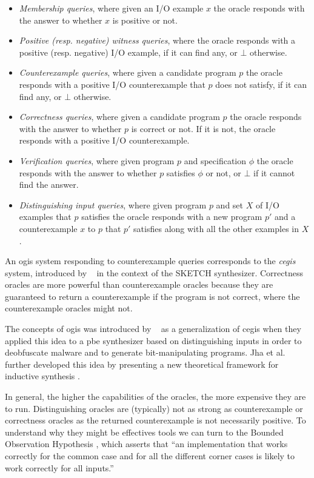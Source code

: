 \begin{itemize}
\item \textit{Membership queries}, where given an I/O example $x$ the oracle
  responds with the answer to whether $x$ is positive or not.
\item \textit{Positive (resp. negative) witness queries}, where the oracle
  responds with a positive (resp. negative) I/O example, if it can find any, or
  $\bot$ otherwise.
\item \textit{Counterexample queries}, where given a candidate program $p$ the
  oracle responds with a positive I/O counterexample that $p$ does not satisfy,
  if it can find any, or $\bot$ otherwise.
\item \textit{Correctness queries}, where given a candidate program $p$ the
  oracle responds with the answer to whether $p$ is correct or not. If it is not,
  the oracle responds with a positive I/O counterexample.
\item \textit{Verification queries}, where given program $p$ and specification
  $\phi$ the oracle responds with the answer to whether $p$ satisfies $\phi$ or
  not, or $\bot$ if it cannot find the answer.
\item \textit{Distinguishing input queries}, where given program $p$ and set $X$
  of I/O examples that $p$ satisfies the oracle responds with a new program $p'$
  and a counterexample $x$ to $p$ that $p'$ satisfies along with all the other
  examples in $X$.
\end{itemize}

An \gls{ogis} system responding to counterexample queries corresponds to the
\textit{\gls{cegis}} system, introduced by
\citeauthor{Solar-Lezama:2008}~\cite{Solar-Lezama:2008} in the context of the
SKETCH synthesizer. Correctness oracles are more powerful than counterexample
oracles because they are guaranteed to return a counterexample if the program is
not correct, where the counterexample oracles might not.

The concepts of \gls{ogis} was introduced by
\citeauthor{Jha:2017:TFS}~\cite{Jha:2017:TFS} as a generalization of \gls{cegis}
when they applied this idea to a \gls{pbe} synthesizer based on distinguishing
inputs in order to deobfuscate malware and to generate bit-manipulating
programs. Jha et al. further developed this idea by presenting a new theoretical
framework for inductive synthesis \cite{Jha:2017:TFS}.

In general, the higher the capabilities of the oracles, the more expensive they
are to run. Distinguishing oracles are (typically) not as strong as
counterexample or correctness oracles as the returned counterexample is not
necessarily positive. To understand why they might be effectives tools we can
turn to the Bounded Observation Hypothesis \cite{Solar-Lezama:2008}, which
asserts that ``an implementation that works correctly for the common case and
for all the different corner cases is likely to work correctly for all inputs.''

